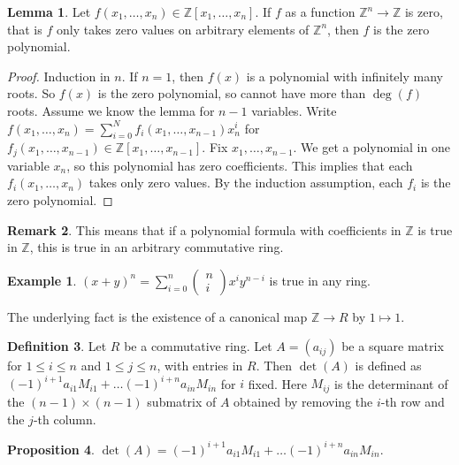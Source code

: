 \documentclass{article}
\newcommand{\Z}{\mathbb{Z}}
\newcommand{\rb}[1]{\left( #1 \right)}
\renewcommand{\sb}[1]{\left[ #1 \right]}
\newcommand{\two}[2]{\begin{pmatrix} #1 \\ #2 \end{pmatrix}}
\theoremstyle{definition}\newtheorem{definition}{Definition}[section]
\theoremstyle{definition}\newtheorem{remark}[definition]{Remark}
\theoremstyle{definition}\newtheorem*{example}{Example}
\theoremstyle{definition}\newtheorem*{note}{Note}
\newtheorem{proposition}[definition]{Proposition}
\newtheorem{lemma}[definition]{Lemma}
\begin{document}
\begin{lemma}
Let $ f\rb{x_1, \dots, x_n} \in \Z\sb{x_1, \dots, x_n} $. If $ f $ as a function $ \Z^n \to \Z $ is zero, that is $ f $ only takes zero values on arbitrary elements of $ \Z^n $, then $ f $ is the zero polynomial.
\end{lemma}

\begin{proof}
Induction in $ n $. If $ n = 1 $, then $ f\rb{x} $ is a polynomial with infinitely many roots. So $ f\rb{x} $ is the zero polynomial, so cannot have more than $ \deg\rb{f} $ roots. Assume we know the lemma for $ n - 1 $ variables. Write $ f\rb{x_1, \dots, x_n} = \sum_{i = 0}^N f_i\rb{x_1, \dots, x_{n - 1}}x_n^i $ for $ f_j\rb{x_1, \dots, x_{n - 1}} \in \Z\sb{x_1, \dots, x_{n - 1}} $. Fix $ x_1, \dots, x_{n - 1} $. We get a polynomial in one variable $ x_n $, so this polynomial has zero coefficients. This implies that each $ f_i\rb{x_1, \dots, x_n} $ takes only zero values. By the induction assumption, each $ f_i $ is the zero polynomial.
\end{proof}

\begin{remark}
\label{rem:7.2}
This means that if a polynomial formula with coefficients in $ \Z $ is true in $ \Z $, this is true in an arbitrary commutative ring.
\end{remark}

\begin{example}
$ \rb{x + y}^n = \sum_{i = 0}^n \two{n}{i}x^iy^{n - i} $ is true in any ring.
\end{example}

The underlying fact is the existence of a canonical map $ \Z \to R $ by $ 1 \mapsto 1 $.

\begin{definition}
Let $ R $ be a commutative ring. Let $ A = \rb{a_{ij}} $ be a square matrix for $ 1 \le i \le n $ and $ 1 \le j \le n $, with entries in $ R $. Then $ \det\rb{A} $ is defined as $ \rb{-1}^{i + 1}a_{i1}M_{i1} + \dots \rb{-1}^{i + n}a_{in}M_{in} $ for $ i $ fixed. Here $ M_{ij} $ is the determinant of the $ \rb{n - 1} \times \rb{n - 1} $ submatrix of $ A $ obtained by removing the $ i $-th row and the $ j $-th column.
\end{definition}

\begin{proposition}
$ \det\rb{A} = \rb{-1}^{i + 1}a_{i1}M_{i1} + \dots \rb{-1}^{i + n}a_{in}M_{in} $.
\end{proposition}
\end{document}
